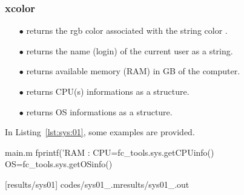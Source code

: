 

\subsubsection{xcolor}
\begin{itemize}
\item[$\bullet$]  returns the rgb color associated with the string color .
\item[$\bullet$]  returns the name (login) of the current user as a string.
\item[$\bullet$]  returns available memory (RAM) in GB of the computer.
\item[$\bullet$]  returns CPU(s) informations as a structure.
\item[$\bullet$]  returns OS informations as a structure.
\end{itemize}

In Listing~\ref{lst:sys:01}, some examples are provided.
\begin{filecontents*}{main.m}
fprintf('RAM : %
CPU=fc_tools.sys.getCPUinfo()
OS=fc_tools.sys.getOSinfo()
\end{filecontents*}
[results/sys01]
%
                      {codes/sys01_\fccmdname\fccmdversionabr.m}{results/sys01_\fccmdname\fccmdversionabr.out}
